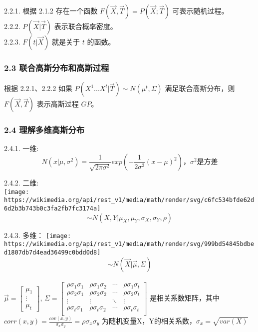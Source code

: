 \documentclass[11pt]{article}
\makeatletter
\def\maxwidth{\ifdim\Gin@nat@width>\linewidth\linewidth
    \else\Gin@nat@width\fi}
\let\Oldincludegraphics\includegraphics
\renewcommand{\includegraphics}[1]{\Oldincludegraphics[width=.8\maxwidth]{#1}}
\makeatother
\begin{document}
2.2.1. 根据 2.1.2 存在一个函数 \(F(\vec{X},\vec{T})=P(\vec{X};\vec{T})\)
可表示随机过程。\\
2.2.2. \(P(\vec{X}|\vec{T})\) 表示联合概率密度。\\
2.2.3. \(F(t|\vec{X})\) 就是关于 \(t\) 的函数。

    \subsubsection{2.3
联合高斯分布和高斯过程}\label{ux8054ux5408ux9ad8ux65afux5206ux5e03ux548cux9ad8ux65afux8fc7ux7a0b}

根据 2.2.1、2.2.2 如果 \(P(X^1 ... X^t|\vec{T}) \sim N(\mu^t, \Sigma)\)
满足联合高斯分布，则 \(F(\vec{X},\vec{T})\) 表示高斯过程 \(GP\)。

    \subsubsection{2.4
理解多维高斯分布}\label{ux7406ux89e3ux591aux7ef4ux9ad8ux65afux5206ux5e03}

2.4.1. 一维:\\
\[N(x|\mu,\sigma^2)=\frac{1}{\sqrt{2\pi \sigma^2}}exp(-\frac{1}{2\sigma^2}(x-\mu)^2)，\sigma^2 是方差\]

2.4.2. 二维:\\
\texttt{[image: https://wikimedia.org/api/rest\_v1/media/math/render/svg/c6fc534bfde62d6d2b3b743b0c3fa2fb7fc3174a]}\\
\[\sim N(X,Y|\mu_X, \mu_Y, \sigma_X, \sigma_Y, \rho)\]

2.4.3. 多维：
\texttt{[image: https://wikimedia.org/api/rest\_v1/media/math/render/svg/999bd54845bdbed1807db7d4ead36499c0bdd0d8]}\\
\[\sim N(\vec{X}|\vec\mu,\Sigma)\]\\
\(\vec\mu=\begin{bmatrix}{\mu_1}\\{\vdots}\\{\mu_t}\end{bmatrix}\),
\(\Sigma=\begin{bmatrix}{\rho\sigma_1\sigma_1}&{\rho\sigma_1\sigma_2}&{\cdots}&{\rho\sigma_1\sigma_t}\\ {\rho\sigma_2\sigma_1}&{\rho\sigma_2\sigma_2}&{\cdots}&{\rho\sigma_2\sigma_t}\\ {\vdots}&{\vdots}&{\ddots}&{\vdots}\\ {\rho\sigma_t\sigma_1}&{\rho\sigma_t\sigma_2}&{\cdots}&{\rho\sigma_t\sigma_t}\\ \end{bmatrix}\)
是相关系数矩阵，其中
\(corr(x, y)=\frac{cov(x,y)}{\sigma_x\sigma_y}=\rho\sigma_x\sigma_y\)
为随机变量X，Y的相关系数，\(\sigma_x=\sqrt{var(X)}\)
\end{document}
